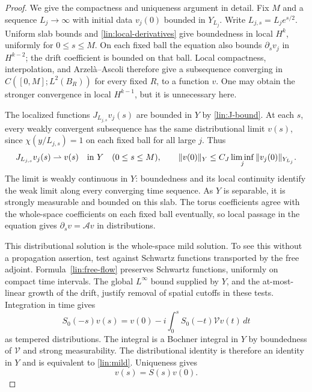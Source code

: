 \begin{proof}
We give the compactness and uniqueness argument in detail.  Fix $M$
and a sequence $L_j\to\infty$ with initial data $v_j(0)$ bounded in
$Y_{L_j}$.  Write $L_{j,s}=L_je^{s/2}$.  Uniform slab bounds and
\eqref{lin:local-derivatives} give boundedness in local $H^k$, uniformly
for $0\le s\le M$.  On each fixed ball the equation also bounds
$\partial_sv_j$ in $H^{k-2}$; the drift coefficient is bounded on
that ball.  Local compactness, interpolation, and Arzel\`a--Ascoli
therefore give a subsequence converging in
$C([0,M];L^2(B_R))$ for every fixed $R$, to a function $v$.
One may obtain the stronger convergence in local $H^{k-1}$, but it
is unnecessary here.

The localized functions $J_{L_{j,s}}v_j(s)$ are bounded in $Y$ by
\eqref{lin:J-bound}.  At each $s$, every weakly convergent subsequence
has the same distributional limit $v(s)$, since $\chi(y/L_{j,s})=1$
on each fixed ball for all large $j$.  Thus
\begin{equation}\label{lin:weak-local-limit}
 J_{L_{j,s}}v_j(s)\rightharpoonup v(s)\quad\hbox{in }Y
 \quad(0\le s\le M),\qquad
 \|v(0)\|_Y\le C_J\liminf_j\|v_j(0)\|_{Y_{L_j}}.
\end{equation}
The limit is weakly continuous in $Y$: boundedness and its local
continuity identify the weak limit along every converging time
sequence.  As $Y$ is separable, it is strongly measurable and bounded
on this slab.  The torus coefficients agree with the whole-space
coefficients on each fixed ball eventually, so local passage in the
equation gives $\partial_sv=\mathcal Av$ in distributions.

This distributional solution is the whole-space mild solution.
To see this without a propagation assertion, test against Schwartz
functions transported by the free adjoint.  Formula~\eqref{lin:free-flow}
preserves Schwartz functions, uniformly on compact time intervals.
The global $L^\infty$ bound supplied by $Y$, and the at-most-linear
growth of the drift, justify removal of spatial cutoffs in these
tests.  Integration in time gives
\[
 S_0(-s)v(s)=v(0)-i\int_0^s S_0(-t)\mathcal Vv(t)\,dt
\]
as tempered distributions.  The integral is a Bochner integral in
$Y$ by boundedness of $\mathcal V$ and strong measurability.  The
distributional identity is therefore an identity in $Y$ and is
equivalent to \eqref{lin:mild}.  Uniqueness gives
\begin{equation}\label{lin:limit-identification}
 v(s)=S(s)v(0).
\end{equation}


\end{proof}
